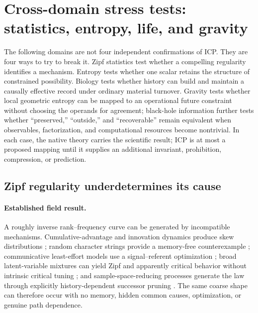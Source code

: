 \section{Cross-domain stress tests: statistics, entropy, life, and gravity}

The following domains are not four independent confirmations of ICP.  They are
four ways to try to break it.  Zipf statistics test whether a compelling
regularity identifies a mechanism.  Entropy tests whether one scalar retains
the structure of constrained possibility.  Biology tests whether history can
build and maintain a causally effective record under ordinary material
turnover. Gravity tests whether local geometric entropy can be mapped to an
operational future constraint without choosing the operands for agreement;
black-hole information further tests whether ``preserved,'' ``outside,'' and
``recoverable'' remain equivalent when observables, factorization, and
computational resources become nontrivial. In each case,
the native theory carries the scientific result; ICP is at most a proposed
mapping until it supplies an additional invariant, prohibition, compression,
or prediction.

\subsection{Zipf regularity underdetermines its cause}

\paragraph{Established field result.}
A roughly inverse rank--frequency curve can be generated by incompatible
mechanisms.  Cumulative-advantage and innovation dynamics produce skew
distributions \citep{Simon1955Skew}; random character strings provide a
memory-free counterexample \citep{Li1992RandomTexts,
FerrerCanchoElvevag2010RandomTexts}; communicative least-effort models use a
signal--referent optimization \citep{FerrerCanchoSole2003LeastEffort}; broad
latent-variable mixtures can yield Zipf and apparently critical behavior
without intrinsic critical tuning \citep{SchwabEtAl2014LatentVariables,
AitchisonEtAl2016UnderlyingVariables}; and sample-space-reducing processes
generate the law through explicitly history-dependent successor pruning
\citep{CorominasMurtraEtAl2015SSR,ThurnerEtAl2015SentenceSSR}.  The same coarse
shape can therefore occur with no memory, hidden common causes, optimization,
or genuine path dependence.

